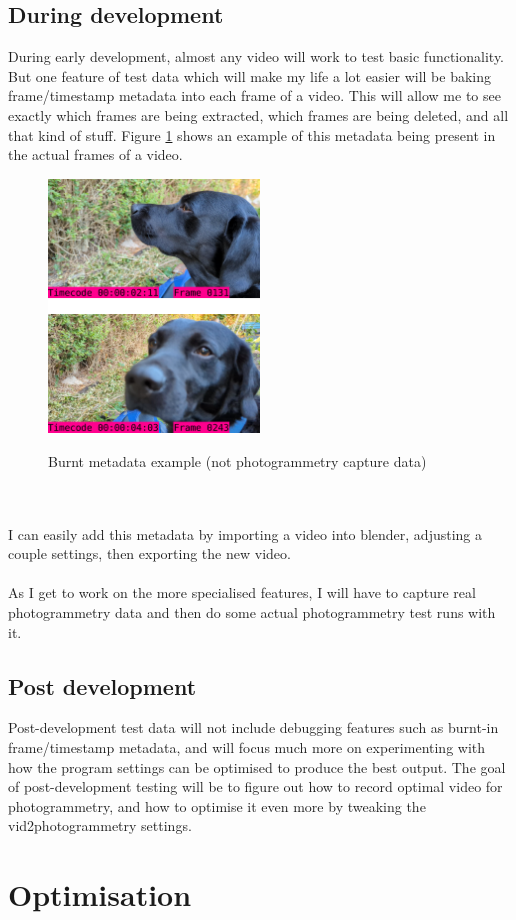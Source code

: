\documentclass[11pt]{report}
\begin{document}
\subsection{During development}
During early development, almost any video will work to test basic functionality. But one feature of test data which will make my life a lot easier will be baking frame/timestamp metadata into each frame of a video. This will allow me to see exactly which frames are being extracted, which frames are being deleted, and all that kind of stuff. Figure \ref{fig:doggy} shows an example of this metadata being present in the actual frames of a video.
\begin{figure}[h!]
	\centering
	\caption{Burnt metadata example (not photogrammetry capture data)}
	\includegraphics[width=0.5\textwidth]{designDiagrams/metadataExample}
	\label{fig:doggy}
\end{figure}\\\\
I can easily add this metadata by importing a video into blender, adjusting a couple settings, then exporting the new video.\\\\
As I get to work on the more specialised features, I will have to capture real photogrammetry data and then do some actual photogrammetry test runs with it.
\subsection{Post development}
Post-development test data will not include debugging features such as burnt-in frame/timestamp metadata, and will focus much more on experimenting with how the program settings can be optimised to produce the best output. The goal of post-development testing will be to figure out how to record optimal video for photogrammetry, and how to optimise it even more by tweaking the vid2photogrammetry settings.

\section{Optimisation}
\end{document}
